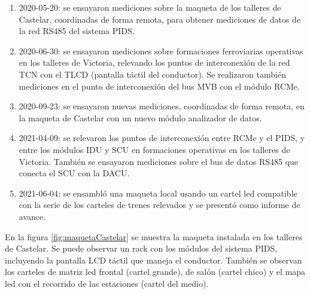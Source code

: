 \begin{enumerate}

\item 2020-05-20: se ensayaron mediciones sobre la maqueta de los talleres de Castelar, coordinadas de forma remota, para obtener mediciones de datos de la red RS485 del sistema PIDS.

\item 2020-06-30: se ensayaron mediciones sobre formaciones ferroviarias operativas en los talleres de Victoria, relevando los puntos de interconexión de la red TCN con el TLCD (pantalla táctil del conductor). Se realizaron también mediciones en el punto de interconexión del bus MVB con el módulo RCMe. 

\item 2020-09-23: se ensayaron nuevas mediciones, coordinadas de forma remota, en la maqueta de Castelar con un nuevo módulo analizador de datos.

\item 2021-04-09: se relevaron los puntos de interconexión entre RCMe y el PIDS, y entre los módulos IDU y SCU en formaciones operativas en los talleres de Victoria. También se ensayaron mediciones sobre el bus de datos RS485 que conecta el SCU con la DACU.

\item 2021-06-04: se ensambló una maqueta local usando un cartel led compatible con la serie de los carteles de trenes relevados y se presentó como informe de avance.

\end{enumerate}


En la figura \ref{fig:maquetaCastelar} se muestra la maqueta instalada en los talleres de Castelar. Se puede observar un rack con los módulos del sistema PIDS, incluyendo la pantalla LCD táctil que maneja el conductor. También se observan los carteles de matriz led frontal (cartel grande), de salón (cartel chico) y el mapa led con el recorrido de las estaciones (cartel del medio).\\
 

